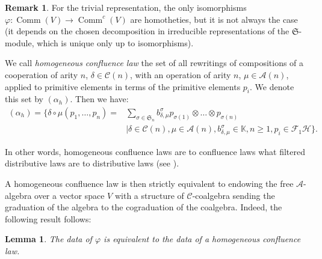 \documentclass[11pt,leqno]{amsart}
\theoremstyle{definition}
\newtheorem{remark}[definition]{Remark}
\theoremstyle{plain}
\newtheorem{lemma}[definition]{Lemma}
\newcommand{\A}{ \mathcal{A} }
\newcommand{\C}{ \mathcal{C} }
\begin{document}
\begin{remark}
For the trivial representation, the only isomorphisms $\varphi : \operatorname{Comm}(V) \rightarrow\operatorname{Comm}^c(V)$ are homotheties, but it is not always the case (it depends on the chosen decomposition in irreducible representations of the $\mathfrak{S}$-module, which is unique only up to isomorphisms).

\end{remark}

We call \emph{homogeneous confluence law} the set of all rewritings of compositions of a cooperation of arity $n$, $\delta\in \C(n)$, with an operation of arity $n$, $\mu \in \A(n)$, applied to primitive elements in terms of the primitive elements $p_i$. We denote this set by $(\alpha_h)$. Then we have: 
\begin{equation}
\begin{split}
(\alpha_h)=\{\delta \circ \mu (p_1, \ldots, p_n) =& \sum_{\sigma \in \mathfrak{S}_n} b^ \sigma_{\delta, \mu} p_{\sigma(1)} \otimes \ldots \otimes p_{\sigma(n)} \\ &| \delta \in \C(n), \mu \in \A(n), b^ \sigma_{\delta, \mu} \in \mathbb{K},  n \geq 1, p_i \in \mathcal{F}_1\mathcal{H}\}.
\end{split}
\end{equation}


In other words, homogeneous confluence laws are to confluence laws what filtered distributive laws are to distributive laws (see \cite{FiltDistLaw, PoissBrack}).



A homogeneous confluence law is then strictly equivalent to endowing the free $\A$-algebra over a vector space $V$ with a structure of $\C$-coalgebra sending the graduation of the algebra to the cograduation of the coalgebra. Indeed, the following result follows:
\begin{lemma}\label{phiLn}
The data of $\varphi$ is equivalent to the data of a homogeneous confluence law.
\end{lemma}
\end{document}
